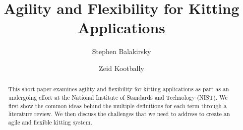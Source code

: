 \documentclass[final,12pt]{elsarticle}
\begin{document}
\begin{frontmatter}



\title{Agility and Flexibility for Kitting Applications}


\author[NIST]{Stephen Balakirsky}
\author[NIST]{Zeid Kootbally}

\address[NIST]{National Institute of Standards and Technology, Gaithersburg, MD USA}

 \begin{abstract}
This short paper examines agility and flexibility for kitting applications as part as an undergoing effort at the National Institute of Standards and Technology (NIST). We first show the common ideas behind the multiple definitions for each term through a literature review. We then discuss the challenges that we need to address to create an agile and flexible kitting system.
 \end{abstract}


\end{frontmatter}
\end{document}
